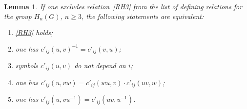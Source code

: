 \documentclass[oneside, 12pt]{amsart}
\theoremstyle{plain}
\numberwithin{equation}{section}
\newtheorem{lemma}{Lemma}
\numberwithin{lemma}{section}
\theoremstyle{remark}
\theoremstyle{definition}
\begin{document}
\begin{lemma}
If one excludes relation~\eqref{RH3} from the list of defining relations for the group $H_n(G)$, $n\geq 3$, the following statements are equivalent:
\begin{enumerate}
\item \label{item1} \eqref{RH3} holds;
\item \label{item4} one has $c'_{ij}(u, v)^{-1} = c'_{ij}(v, u)$;
\item \label{item5} symbols $c'_{ij}(u, v)$ do not depend on $i$;
\item \label{item5} one has $c'_{ij}(u, vw) = c'_{ij}(wu, v) \cdot c'_{ij}(uv, w)$;
\item \label{item6} one has $c'_{ij}(u, vu^{-1}) = c'_{ij}(uv, u^{-1})$.
\end{enumerate}
\end{lemma}
\end{document}
